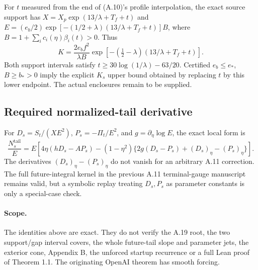 For $t$ measured from the end of (A.10)'s profile
interpolation, the exact source support has
$X=X_p\exp(13/\lambda+T_f+t)$ and
$E=(e_b/2)\exp[-(1/2+\lambda)(13/\lambda+T_f+t)]B$,
where $B=1+\sum_i c_i(\eta)\beta_i(t)>0$.
Thus
\[
K=\frac{2e_b f^2}{\lambda B}
\exp[-(\tfrac12-\lambda)(13/\lambda+T_f+t)].
\]
Both support intervals satisfy
$t\ge30\log(1/\lambda)-63/20$.
Certified $e_b\le e_*$, $B\ge b_*>0$ imply the explicit
$K_s$ upper bound obtained by replacing $t$ by this
lower endpoint. The actual enclosures remain to be supplied.

\subsection*{Required normalized-tail derivative}
For $D_s=S_t/(XE^2)$, $P_s=-\Pi_t/E^2$, and
$g=\partial_\eta\log E$, the exact local form is
\[
\frac{N_s^{\mathrm{tail}}}{E}
=E[4\eta(hD_s-AP_s)
 -(1-\eta^2)\{2g(D_s-P_s)
 +(D_s)_\eta-(P_s)_\eta\}].
\]
The derivatives $(D_s)_\eta-(P_s)_\eta$ do not vanish
for an arbitrary A.11 correction.
The full future-integral kernel in the previous
A.11 terminal-gauge manuscript remains valid, but a
symbolic replay treating $D_s,P_s$ as parameter constants
is only a special-case check.

\paragraph{Scope.}
The identities above are exact. They do not verify the
A.19 root, the two support/gap interval covers, the
whole future-tail slope and parameter jets, the exterior cone,
Appendix B, the unforced startup recurrence or a full Lean
proof of Theorem 1.1. The originating OpenAI theorem has
smooth forcing.
